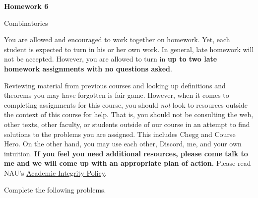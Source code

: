 \documentclass[11pt]{article}%
\theoremstyle{definition}
\newcommand{\blankline}{\pagebreak[2]\vspace{.5\baselineskip}}
\begin{document}
\begin{center}
{\Large\bf Homework 6}

\smallskip

Combinatorics
\end{center}

\thispagestyle{fancy}

You are allowed and encouraged to work together on homework. Yet, each student is expected to turn in his or her own work. In general, late homework will not be accepted. However, you are allowed to turn in \textbf{up to two late homework assignments with no questions asked}. 

\blankline

Reviewing material from previous courses and looking up definitions and theorems you may have forgotten is fair game. However, when it comes to completing assignments for this course, you should \emph{not} look to resources outside the context of this course for help.  That is, you should not be consulting the web, other texts, other faculty, or students outside of our course in an attempt to find solutions to the problems you are assigned.  This includes Chegg and Course Hero. On the other hand, you may use each other, Discord, me, and your own intuition. \textbf{If you feel you need additional resources, please come talk to me and we will come up with an appropriate plan of action.} Please read NAU's \href{https://www5.nau.edu/policies/Client/Details/828?whoIsLooking=Students&pertainsTo=All&sortDirection=Ascending&page=1}{Academic Integrity Policy}.

\blankline

Complete the following problems. 
\end{document}
